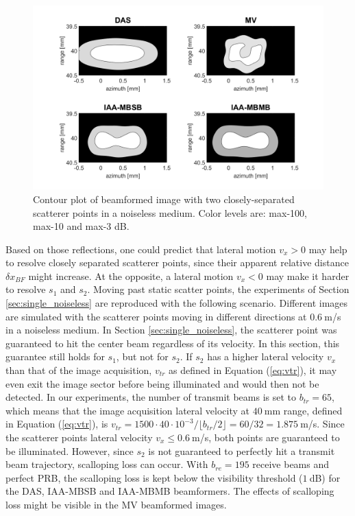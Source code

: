 \begin{figure}[ht]
    \centering
    \includegraphics[width=\linewidth]{./images/results/2.2/motion_0_0.png}
    \caption[Contour plot of beamformed image with two closely-separated scatterer points in a noiseless medium.]{Contour plot of beamformed image with two closely-separated scatterer points in a noiseless medium. Color levels are: max-100, max-10 and max-3 dB.}
    \label{fig:two_points_static}
\end{figure}

Based on those reflections, one could predict that lateral motion $v_x > 0$ may help to resolve closely separated scatterer points, since their apparent relative distance $\delta x_{BF}$ might increase. At the opposite, a lateral motion $v_x < 0$ may make it harder to resolve $s_1$ and $s_2$. 
Moving past static scatter points, the experiments of Section \ref{sec:single_noiseless} are reproduced with the following scenario.  Different images are simulated with the scatterer points moving in different directions at $0.6~$m/s in a noiseless medium.
In Section \ref{sec:single_noiseless}, the scatterer point was guaranteed to hit the center beam regardless of its velocity. In this section, this guarantee still holds for $s_1$, but not for $s_2$. If $s_2$ has a higher lateral velocity $v_x$ than that of the image acquisition, $v_{tr}$ as defined in Equation (\ref{eq:vtr}), it may even exit the image sector before being illuminated and would then not be detected. In our experiments, the number of transmit beams is set to $b_{tr} = 65$, which means that the image acquisition lateral velocity at $40~$mm range, defined in Equation (\ref{eq:vtr}), is $v_{tr} = 1500 \cdot 40 \cdot 10^{-3} / \lfloor b_{tr} / 2 \rfloor = 60 / 32 = 1.875~$m/s. Since the scatterer points lateral velocity $v_x \leq 0.6~$m/s, both points are guaranteed to be illuminated.
However, since $s_2$ is not guaranteed to perfectly hit a transmit beam trajectory, scalloping loss can occur. With $b_{re} = 195$ receive beams and perfect PRB, the scalloping loss is kept below the visibility threshold ($1~$dB) for the DAS, IAA-MBSB and IAA-MBMB beamformers. The effects of scalloping loss might be visible in the MV beamformed images.

